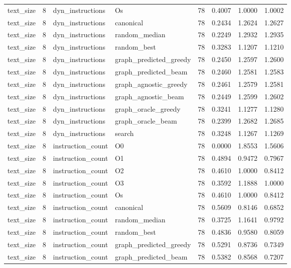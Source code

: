 \begin{table}[t]
\begin{tabular}{lrllrrrr}
text\_size & 8 & dyn\_instructions & Os & 78 & 0.4007 & 1.0000 & 1.0002 \\
text\_size & 8 & dyn\_instructions & canonical & 78 & 0.2434 & 1.2624 & 1.2627 \\
text\_size & 8 & dyn\_instructions & random\_median & 78 & 0.2249 & 1.2932 & 1.2935 \\
text\_size & 8 & dyn\_instructions & random\_best & 78 & 0.3283 & 1.1207 & 1.1210 \\
text\_size & 8 & dyn\_instructions & graph\_predicted\_greedy & 78 & 0.2450 & 1.2597 & 1.2600 \\
text\_size & 8 & dyn\_instructions & graph\_predicted\_beam & 78 & 0.2460 & 1.2581 & 1.2583 \\
text\_size & 8 & dyn\_instructions & graph\_agnostic\_greedy & 78 & 0.2461 & 1.2579 & 1.2581 \\
text\_size & 8 & dyn\_instructions & graph\_agnostic\_beam & 78 & 0.2449 & 1.2599 & 1.2602 \\
text\_size & 8 & dyn\_instructions & graph\_oracle\_greedy & 78 & 0.3241 & 1.1277 & 1.1280 \\
text\_size & 8 & dyn\_instructions & graph\_oracle\_beam & 78 & 0.2399 & 1.2682 & 1.2685 \\
text\_size & 8 & dyn\_instructions & search & 78 & 0.3248 & 1.1267 & 1.1269 \\
text\_size & 8 & instruction\_count & O0 & 78 & 0.0000 & 1.8553 & 1.5606 \\
text\_size & 8 & instruction\_count & O1 & 78 & 0.4894 & 0.9472 & 0.7967 \\
text\_size & 8 & instruction\_count & O2 & 78 & 0.4610 & 1.0000 & 0.8412 \\
text\_size & 8 & instruction\_count & O3 & 78 & 0.3592 & 1.1888 & 1.0000 \\
text\_size & 8 & instruction\_count & Os & 78 & 0.4610 & 1.0000 & 0.8412 \\
text\_size & 8 & instruction\_count & canonical & 78 & 0.5609 & 0.8146 & 0.6852 \\
text\_size & 8 & instruction\_count & random\_median & 78 & 0.3725 & 1.1641 & 0.9792 \\
text\_size & 8 & instruction\_count & random\_best & 78 & 0.4836 & 0.9580 & 0.8059 \\
text\_size & 8 & instruction\_count & graph\_predicted\_greedy & 78 & 0.5291 & 0.8736 & 0.7349 \\
text\_size & 8 & instruction\_count & graph\_predicted\_beam & 78 & 0.5382 & 0.8568 & 0.7207 \\

\end{tabular}
\end{table}
